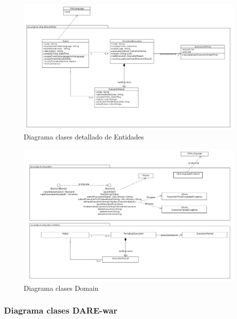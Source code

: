 \begin{landscape}

\begin{figure}[hp]
\includegraphics[width=1.4\textwidth]{chapters/technical-manual/diagrams/entidades_domain.png}
\caption{Diagrama clases detallado de Entidades}\label{diagrama_clases_entidades_domain}
\end{figure}

\begin{figure}[hp]
\includegraphics[width=1.4\textwidth]{chapters/technical-manual/diagrams/clases_domain.png}
\caption{Diagrama clases Domain}\label{diagrama_clases_domain}
\end{figure}

\end{landscape}

\subsubsection{Diagrama clases DARE-war}

